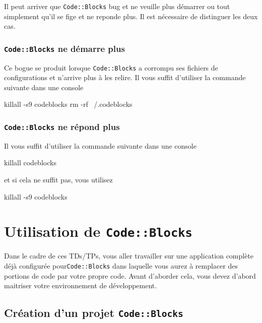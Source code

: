 Il peut arriver que \verb-Code::Blocks- bug et ne veuille plus démarrer ou tout simplement qu'il se fige et ne reponde plus. Il est nécessaire de distinguer les deux cas.

\subsubsection{\texttt{Code::Blocks} ne démarre plus} 

Ce bogue se produit lorsque \verb-Code::Blocks- a corrompu ses fichiers de configurations et n'arrive plus à les relire. Il vous suffit d'utiliser la commande suivante dans une console
\begin{bashsource}
killall -s9 codeblocks
rm -rf ~/.codeblocks
\end{bashsource}

\subsubsection{\texttt{Code::Blocks} ne répond plus}

 Il vous suffit d'utiliser la commande suivante dans une console
  \begin{bashsource}
killall codeblocks
  \end{bashsource}
  et si cela ne suffit pas, vous utilisez 
  \begin{bashsource}
killall -s9 codeblocks 
  \end{bashsource}
  
\section{Utilisation de \texttt{Code::Blocks}}
   
Dans le cadre de ces TDs/TPs, vous aller travailler sur une application complète déjà configurée pour\linebreak \verb-Code::Blocks- dans laquelle vous aurez à remplacer des portions de code par votre propre code. Avant d'aborder cela, vous devez d'abord maitriser votre environnement de développement.

\subsection{Création d'un projet \texttt{Code::Blocks}}

